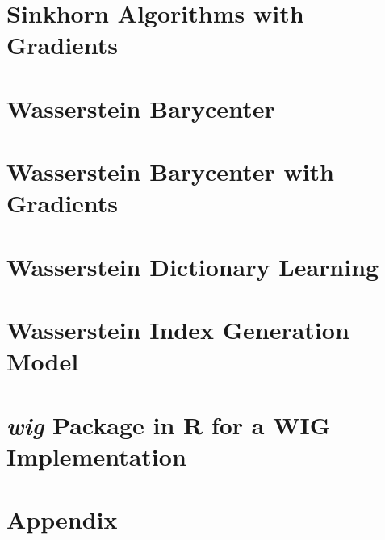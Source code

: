 \documentclass[oneside,12pt,letterpaper]{article}
\begin{document}
\section{Sinkhorn Algorithms with Gradients}\label{sec:sinkhorn-gradient}


\section{Wasserstein Barycenter}\label{sec:wasserstein-barycenter}


\section{Wasserstein Barycenter with Gradients}\label{sec:barycenter-gradient}


\section{Wasserstein Dictionary Learning}\label{sec:wdl}


\section{Wasserstein Index Generation Model}\label{sec:wig-model}
\citet{xie2020}

\section{\textbf{\textit{wig}} Package in R for a WIG Implementation}\label{sec:wig-package}
\citet{xie2020a}


% 

\newpage
{}
\printbibliography

\newpage
\section*{Appendix}
\label{appendix}
\appendix
\setcounter{secnumdepth}{0}


\end{document}
